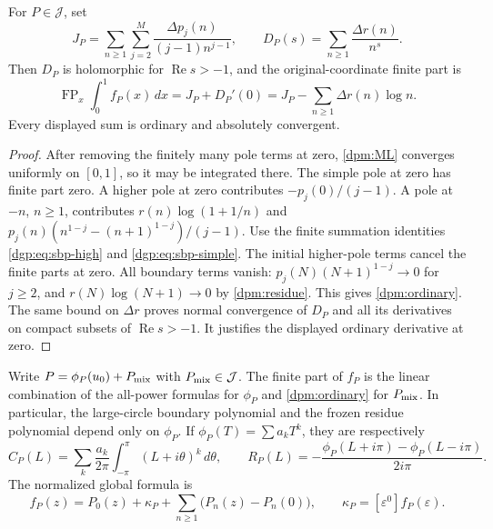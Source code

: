 \begin{theorem}
\label{dpm:FP}
For $P\in\mathcal J$, set
\[
 J_P=\sum_{n\ge1}\sum_{j=2}^M
       \frac{\Delta p_j(n)}{(j-1)n^{j-1}},\qquad
 D_P(s)=\sum_{n\ge1}\frac{\Delta r(n)}{n^s}.
\]
Then $D_P$ is holomorphic for $\operatorname{Re}s>-1$, and the
original-coordinate finite part is
\begin{equation}\label{dpm:ordinary}
 \boxed{\operatorname{FP}_x\int_0^1 f_P(x)\,dx
   =J_P+D_P'(0)
   =J_P-\sum_{n\ge1}\Delta r(n)\log n.}
\end{equation}
Every displayed sum is ordinary and absolutely convergent.
\end{theorem}

\begin{proof}
After removing the finitely many pole terms at zero,
\eqref{dpm:ML} converges uniformly on $[0,1]$, so it may be integrated
there.  The simple pole at zero has finite part zero.  A higher pole
at zero contributes $-p_j(0)/(j-1)$.  A pole at $-n$, $n\ge1$,
contributes $r(n)\log(1+1/n)$ and
$p_j(n)(n^{1-j}-(n+1)^{1-j})/(j-1)$.
Use the finite summation identities
\eqref{dgp:eq:sbp-high} and \eqref{dgp:eq:sbp-simple}.
The initial higher-pole terms cancel the finite parts at zero.
All boundary terms vanish: $p_j(N)(N+1)^{1-j}\to0$ for $j\ge2$,
and $r(N)\log(N+1)\to0$ by \eqref{dpm:residue}.
This gives \eqref{dpm:ordinary}.  The same bound on $\Delta r$
proves normal convergence of $D_P$ and all its derivatives on compact
subsets of $\operatorname{Re}s>-1$.  It justifies the displayed
ordinary derivative at zero.
\end{proof}

\begin{corollary}
\label{dpm:allP}
Write $P=\phi_P(u_0)+P_{\rm mix}$ with $P_{\rm mix}\in\mathcal J$.
The finite part of $f_P$ is the linear combination of the all-power
formulas for $\phi_P$ and \eqref{dpm:ordinary} for $P_{\rm mix}$.
In particular, the large-circle boundary polynomial and the frozen
residue polynomial depend only on $\phi_P$.  If
$\phi_P(T)=\sum a_kT^k$, they are respectively
\[
 C_P(L)=\sum_k\frac{a_k}{2\pi}\int_{-\pi}^{\pi}(L+i\theta)^k\,d\theta,
 \qquad
 R_P(L)=-\frac{\phi_P(L+i\pi)-\phi_P(L-i\pi)}{2i\pi}.
\]
The normalized global formula is
\[
 f_P(z)=P_0(z)+\kappa_P+
       \sum_{n\ge1}\bigl(P_n(z)-P_n(0)\bigr),
 \qquad \kappa_P=[\varepsilon^0]f_P(\varepsilon).
\]
\end{corollary}


